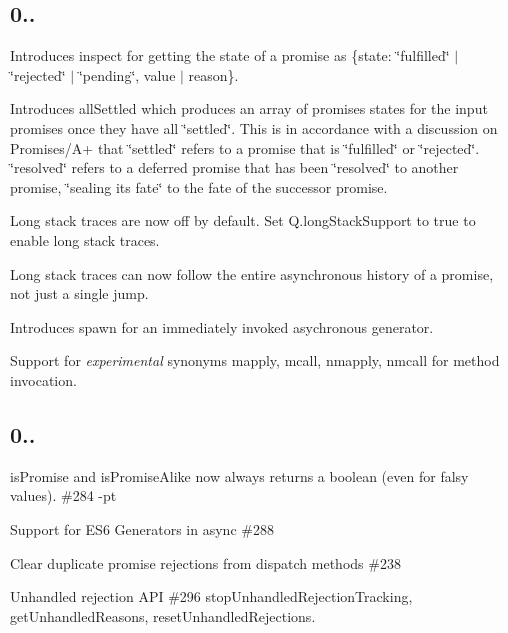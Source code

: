 \subsection*{0..}


\begin{DoxyItemize}
\item Introduces {\ttfamily inspect} for getting the state of a promise as {\ttfamily \{state\+: \char`\"{}fulfilled\char`\"{} $\vert$ \char`\"{}rejected\char`\"{} $\vert$ \char`\"{}pending\char`\"{}, value $\vert$ reason\}}.
\item Introduces {\ttfamily all\+Settled} which produces an array of promises states for the input promises once they have all \char`\"{}settled\char`\"{}. This is in accordance with a discussion on Promises/\+A+ that \char`\"{}settled\char`\"{} refers to a promise that is \char`\"{}fulfilled\char`\"{} or \char`\"{}rejected\char`\"{}. \char`\"{}resolved\char`\"{} refers to a deferred promise that has been \char`\"{}resolved\char`\"{} to another promise, \char`\"{}sealing its fate\char`\"{} to the fate of the successor promise.
\item Long stack traces are now off by default. Set {\ttfamily Q.\+long\+Stack\+Support} to true to enable long stack traces.
\item Long stack traces can now follow the entire asynchronous history of a promise, not just a single jump.
\item Introduces {\ttfamily spawn} for an immediately invoked asychronous generator. 
\item Support for {\itshape experimental} synonyms {\ttfamily mapply}, {\ttfamily mcall}, {\ttfamily nmapply}, {\ttfamily nmcall} for method invocation.
\end{DoxyItemize}

\subsection*{0..}


\begin{DoxyItemize}
\item {\ttfamily is\+Promise} and {\ttfamily is\+Promise\+Alike} now always returns a boolean (even for falsy values). \#284 -\/pt
\item Support for E\+S6 Generators in {\ttfamily async} \#288 
\item Clear duplicate promise rejections from dispatch methods \#238 
\item Unhandled rejection A\+PI \#296  {\ttfamily stop\+Unhandled\+Rejection\+Tracking}, {\ttfamily get\+Unhandled\+Reasons}, {\ttfamily reset\+Unhandled\+Rejections}.
\end{DoxyItemize}

